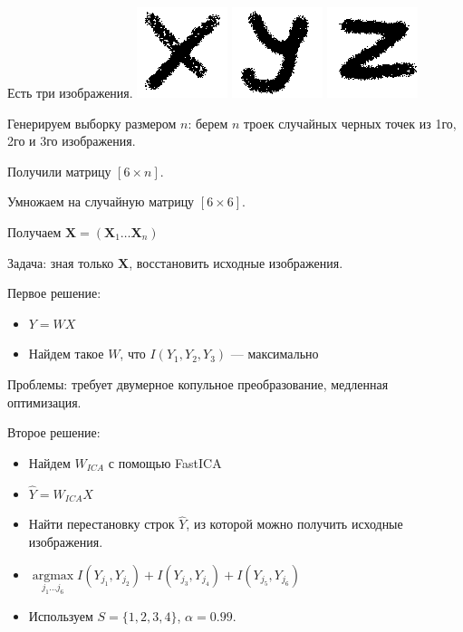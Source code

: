 \documentclass[14pt]{beamer}
\begin{document}
\begin{frame}
    Есть три изображения.
    \includegraphics[scale=0.5]{x.png}
    \includegraphics[scale=0.5]{y.png}
    \includegraphics[scale=0.5]{z.png}

    Генерируем выборку размером $n$:
    берем $n$ троек случайных черных точек из 1го, 2го и 3го изображения.

    Получили матрицу $[6 \times n]$.

    Умножаем на случайную матрицу $[6\times6]$.

    Получаем $\mathbf X = (\mathbf X_1 \dots \mathbf X_n)$

    Задача: зная только $\mathbf X$, восстановить исходные изображения.

\end{frame}

\begin{frame}
Первое решение:

\begin{itemize}
    \item $Y = W X $
    \item Найдем такое $W$, что $ I (Y_1, Y_2,Y_3) $ — максимально
\end{itemize}
\pause
Проблемы:
требует двумерное копульное преобразование,
медленная оптимизация.
\end{frame}

\begin{frame}
    Второе решение:
    \begin{itemize}
        \item Найдем $W_{ICA}$ с помощью FastICA
        \item $\widehat Y = W_{ICA} X $
        \item Найти перестановку строк $\widehat Y$, из которой можно получить исходные изображения.
        \item $\mathop{argmax}\limits_{j_1 \dots j_6} I(Y_{j_1}, Y_{j_2}) + I(Y_{j_3}, Y_{j_4})  + I(Y_{j_5}, Y_{j_6}) $
        \item Используем $ S = \{ 1, 2, 3, 4 \} $, $\alpha = 0.99$.
    \end{itemize}
\end{frame}
\end{document}
